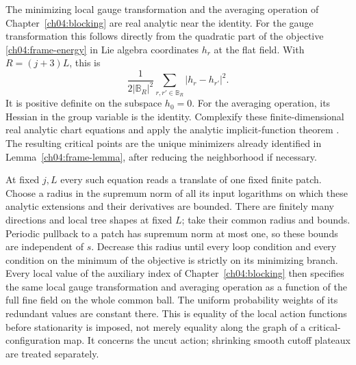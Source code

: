 The minimizing local gauge transformation and the averaging operation of Chapter~\ref{ch04:blocking} are
real analytic near the identity. For the gauge transformation this follows directly from
the quadratic part of the objective \eqref{ch04:frame-energy} in Lie algebra coordinates $h_r$
at the flat field. With $R=(j+3)L$, this is
\[
 \frac{1}{2|\mathbb B_R|^2}\sum_{r,r'\in\mathbb B_R}|h_r-h_{r'}|^2 .
\]
It is positive definite on the subspace $h_0=0$. For the averaging operation, its Hessian in the group variable
is the identity. Complexify these finite-dimensional real analytic chart
equations and apply the analytic implicit-function theorem
\cite[Theorem 1.3.8]{LeblSCV}. The resulting critical points are the unique
minimizers already identified in Lemma~\ref{ch04:frame-lemma}, after
reducing the neighborhood if necessary.

At fixed $j,L$ every such equation reads a translate of one fixed finite
patch. Choose a radius in the supremum norm of all its input logarithms
on which these analytic extensions and their derivatives are bounded.
There are finitely many directions and local tree shapes at fixed $L$;
take their common radius and bounds. Periodic pullback to a patch has
supremum norm at most one, so these bounds are independent of $s$.
Decrease this radius until every loop condition and every condition on the minimum of the objective is
strictly on its minimizing branch. Every local value of the auxiliary index of Chapter~\ref{ch04:blocking} then specifies the
same local gauge transformation and averaging operation as a function of the full fine field on the
whole common ball. The uniform probability weights of its redundant values are constant there.
This is equality of the local action functions before stationarity is
imposed, not merely equality along the graph of a critical-configuration map. It concerns the
uncut action; shrinking smooth cutoff plateaux are treated separately.

